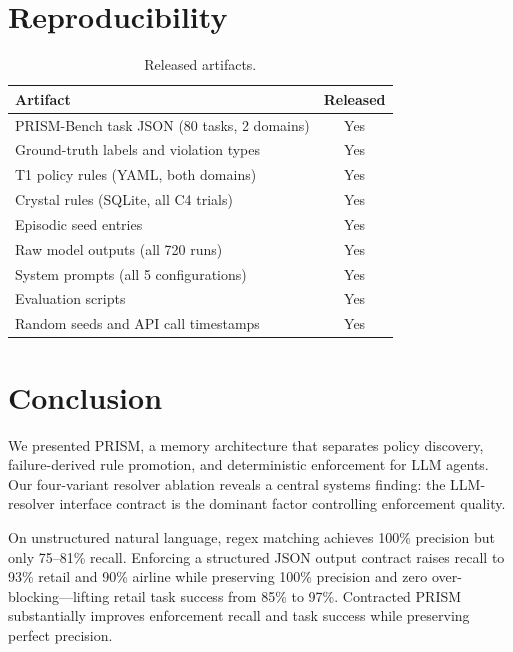 \documentclass[11pt]{article}
\begin{document}
\section{Reproducibility}
\label{sec:repro}

\begin{table}[h]
\centering
\caption{Released artifacts.}
\label{tab:artifacts}
\small
\begin{tabular}{@{}lc@{}}
\toprule
Artifact & Released \\
\midrule
PRISM-Bench task JSON (80 tasks, 2 domains) & Yes \\
Ground-truth labels and violation types & Yes \\
T1 policy rules (YAML, both domains) & Yes \\
Crystal rules (SQLite, all C4 trials) & Yes \\
Episodic seed entries & Yes \\
Raw model outputs (all 720 runs) & Yes \\
System prompts (all 5 configurations) & Yes \\
Evaluation scripts & Yes \\
Random seeds and API call timestamps & Yes \\
\bottomrule
\end{tabular}
\end{table}

\section{Conclusion}
\label{sec:conclusion}

We presented PRISM, a memory architecture that separates policy discovery,
failure-derived rule promotion, and deterministic enforcement for LLM agents.
Our four-variant resolver ablation reveals a central systems finding:
the LLM-resolver interface contract is the dominant factor controlling
enforcement quality.

On unstructured natural language, regex matching achieves 100\% precision
but only 75--81\% recall. Enforcing a structured JSON output contract
raises recall to 93\% retail and 90\% airline while preserving 100\%
precision and zero over-blocking---lifting retail task success from
85\% to 97\%.
Contracted PRISM substantially improves enforcement recall and task
success while preserving perfect precision.
\end{document}
